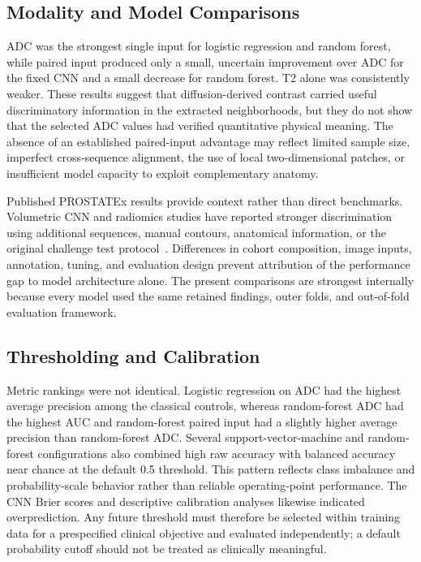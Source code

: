 \documentclass[11pt]{article}
\begin{document}
\subsection{Modality and Model Comparisons}\label{sec:5.2}

ADC was the strongest single input for logistic regression and random forest, while paired input produced only a small, uncertain improvement over ADC for the fixed CNN and a small decrease for random forest. T2 alone was consistently weaker. These results suggest that diffusion-derived contrast carried useful discriminatory information in the extracted neighborhoods, but they do not show that the selected ADC values had verified quantitative physical meaning. The absence of an established paired-input advantage may reflect limited sample size, imperfect cross-sequence alignment, the use of local two-dimensional patches, or insufficient model capacity to exploit complementary anatomy.

Published PROSTATEx results provide context rather than direct benchmarks. Volumetric CNN and radiomics studies have reported stronger discrimination using additional sequences, manual contours, anatomical information, or the original challenge test protocol~\cite{mehrtash-prostatex,kwon-prostatex}. Differences in cohort composition, image inputs, annotation, tuning, and evaluation design prevent attribution of the performance gap to model architecture alone. The present comparisons are strongest internally because every model used the same retained findings, outer folds, and out-of-fold evaluation framework.

\subsection{Thresholding and Calibration}\label{sec:5.3}

Metric rankings were not identical. Logistic regression on ADC had the highest average precision among the classical controls, whereas random-forest ADC had the highest AUC and random-forest paired input had a slightly higher average precision than random-forest ADC. Several support-vector-machine and random-forest configurations also combined high raw accuracy with balanced accuracy near chance at the default 0.5 threshold. This pattern reflects class imbalance and probability-scale behavior rather than reliable operating-point performance. The CNN Brier scores and descriptive calibration analyses likewise indicated overprediction. Any future threshold must therefore be selected within training data for a prespecified clinical objective and evaluated independently; a default probability cutoff should not be treated as clinically meaningful.
\end{document}
